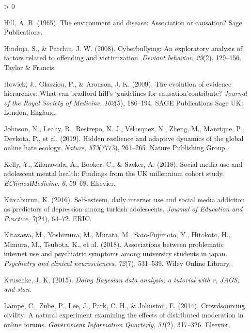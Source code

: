 \documentclass[
  10pt,
  dvipsnames]{scrartcl}
\newlength{\cslhangindent}
\newenvironment{CSLReferences}[2] %
 {%
  \setlength{\parindent}{0pt}
  \ifodd #1 \everypar{\setlength{\hangindent}{\cslhangindent}}\ignorespaces\fi
  \ifnum #2 > 0
  \setlength{\parskip}{#2\baselineskip}
  \fi
 }%
 {}
\begin{document}
\begin{CSLReferences}{1}{0}
\leavevmode\hypertarget{ref-hill1965environment}{}%
Hill, A. B. (1965). The environment and disease: Association or
causation? Sage Publications.

\leavevmode\hypertarget{ref-hinduja2008cyberbullying}{}%
Hinduja, S., \& Patchin, J. W. (2008). Cyberbullying: An exploratory
analysis of factors related to offending and victimization.
\emph{Deviant behavior}, \emph{29}(2), 129--156. Taylor \& Francis.

\leavevmode\hypertarget{ref-howick2009evolution}{}%
Howick, J., Glasziou, P., \& Aronson, J. K. (2009). The evolution of
evidence hierarchies: What can bradford hill's `guidelines for
causation'contribute? \emph{Journal of the Royal Society of Medicine},
\emph{102}(5), 186--194. SAGE Publications Sage UK: London, England.

\leavevmode\hypertarget{ref-johnson2019hidden}{}%
Johnson, N., Leahy, R., Restrepo, N. J., Velasquez, N., Zheng, M.,
Manrique, P., Devkota, P., et al. (2019). Hidden resilience and adaptive
dynamics of the global online hate ecology. \emph{Nature},
\emph{573}(7773), 261--265. Nature Publishing Group.

\leavevmode\hypertarget{ref-kelly2018social}{}%
Kelly, Y., Zilanawala, A., Booker, C., \& Sacker, A. (2018). Social
media use and adolescent mental health: Findings from the UK millennium
cohort study. \emph{EClinicalMedicine}, \emph{6}, 59--68. Elsevier.

\leavevmode\hypertarget{ref-kircaburun2016self}{}%
Kircaburun, K. (2016). Self-esteem, daily internet use and social media
addiction as predictors of depression among turkish adolescents.
\emph{Journal of Education and Practice}, \emph{7}(24), 64--72. ERIC.

\leavevmode\hypertarget{ref-kitazawa2018associations}{}%
Kitazawa, M., Yoshimura, M., Murata, M., Sato-Fujimoto, Y., Hitokoto,
H., Mimura, M., Tsubota, K., et al. (2018). Associations between
problematic internet use and psychiatric symptoms among university
students in japan. \emph{Psychiatry and clinical neurosciences},
\emph{72}(7), 531--539. Wiley Online Library.

\leavevmode\hypertarget{ref-Kruschke2015}{}%
Kruschke, J. K. (2015). \emph{Doing {B}ayesian data analysis; a tutorial
with {r}, {JAGS}, and {stan}}.

\leavevmode\hypertarget{ref-lampe2014crowdsourcing}{}%
Lampe, C., Zube, P., Lee, J., Park, C. H., \& Johnston, E. (2014).
Crowdsourcing civility: A natural experiment examining the effects of
distributed moderation in online forums. \emph{Government Information
Quarterly}, \emph{31}(2), 317--326. Elsevier.


\end{CSLReferences}
\end{document}
